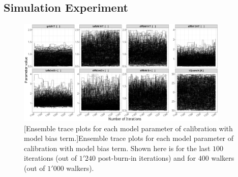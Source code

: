 \subsection{Simulation Experiment}\label{sub:bc_simulation_experiment}









\clearpage
\begin{figure}
	\centering
	\includegraphics[width=0.90\textwidth]{../figures/chapter5/figures/plotEnsTraceDiscAllCentered}
		[Ensemble trace plots for each model parameter of calibration with model bias term.]{Ensemble trace plots for each model parameter of calibration with model bias term. Shown here is for the last $100$ iterations (out of $1'240$ post-burn-in iterations) and for $400$ walkers (out of $1'000$ walkers).}
	\label{fig:ch5_plot_ens_trace_all_disc_centered}
\end{figure}
\clearpage